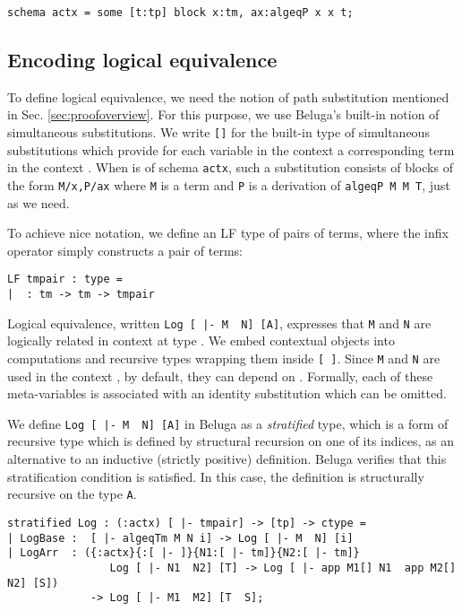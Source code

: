 \documentclass[copyright,creativecommons]{eptcs}
\begin{document}
\begin{lstlisting}
schema actx = some [t:tp] block x:tm, ax:algeqP x x t;
\end{lstlisting}

\subsection{Encoding logical equivalence}
To define logical equivalence, we need the notion of 
path substitution mentioned in
Sec. \ref{sec:proofoverview}. For this purpose, we use Beluga's
built-in notion of simultaneous substitutions. We write \lstinline{[]} for the
built-in type of simultaneous substitutions which provide for each
variable in the context  a corresponding term in the context
. When  is of schema \lstinline{actx}, such a
substitution consists of blocks of the form \lstinline{M/x,P/ax} where
\lstinline{M} is a term and \lstinline{P} is a derivation of \lstinline{algeqP M M T}, just as we need.

To achieve nice notation, we define an LF type of
pairs of terms, where the infix operator  simply constructs a pair
of terms:

\begin{lstlisting}
LF tmpair : type = 
|  : tm -> tm -> tmpair \end{lstlisting}

Logical equivalence, written \lstinline{Log [ |- M  N] [A]},
expresses that \lstinline!M! and \lstinline!N! are logically related
in context  at type . We embed contextual objects into
computations and recursive types wrapping them inside
 \lstinline![ ]!. Since \lstinline!M! and \lstinline!N! are used in
 the context , by default, they can depend on
 . Formally, each of these meta-variables is associated with
 an identity substitution which can be omitted. 

We define \lstinline{Log [ |- M  N] [A]} in Beluga 
as a \emph{stratified}
type, which is a form of recursive type which is defined by structural recursion on one of its indices, as an
alternative to an inductive (strictly positive) definition. Beluga verifies that this
stratification condition is satisfied. In this case, the definition is
structurally recursive on the type \lstinline{A}.

\begin{lstlisting}
stratified Log : (:actx) [ |- tmpair] -> [tp] -> ctype =
| LogBase :  [ |- algeqTm M N i] -> Log [ |- M  N] [i]
| LogArr  : ({:actx}{:[ |- ]}{N1:[ |- tm]}{N2:[ |- tm]}
                Log [ |- N1  N2] [T] -> Log [ |- app M1[] N1  app M2[] N2] [S])
             -> Log [ |- M1  M2] [T  S];
\end{lstlisting}
\end{document}
